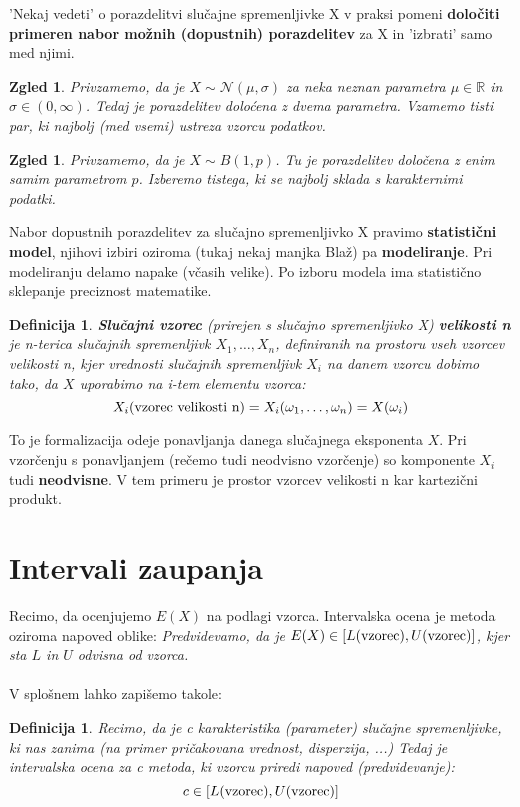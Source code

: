 \documentclass[11pt]{article}
\newtheorem{Definicija}[Izrek]{{\sc Definicija}}
\newtheorem{Zgled}[Izrek]{{\sc Zgled}}
\begin{document}
'Nekaj vedeti' o porazdelitvi slučajne spremenljivke X v praksi pomeni \textbf{določiti primeren nabor možnih (dopustnih) porazdelitev} za X in 'izbrati' samo med njimi.
\begin{Zgled}
	Privzamemo, da je $X\sim \mathcal{N}(\mu, \sigma)$ za neka neznan parametra  $\mu \in \mathbb{R}$ in $\sigma\in(0, \infty)$. Tedaj je porazdelitev doloćena z dvema parametra. Vzamemo tisti par, ki najbolj (med vsemi) ustreza vzorcu podatkov.
\end{Zgled}		
\begin{Zgled}
	Privzamemo, da je $X\sim B(1,p)$. Tu je porazdelitev določena  z enim samim parametrom $p$. Izberemo tistega, ki se najbolj sklada s karakternimi podatki.
\end{Zgled}

Nabor dopustnih porazdelitev za slučajno spremenljivko X pravimo \textbf{statistični model}, njihovi izbiri oziroma (tukaj nekaj manjka Blaž) pa \textbf{modeliranje}. Pri modeliranju delamo napake (včasih velike). Po izboru modela ima statistično sklepanje preciznost matematike.
\begin{Definicija}
	\textbf{Slučajni vzorec} (prirejen s slučajno spremenljivko X) \textbf{velikosti n} je n-terica slučajnih spremenljivk $X_1, \ldots, X_n$, definiranih na prostoru vseh vzorcev velikosti n, kjer vrednosti slučajnih spremenljivk $X_i$ na danem vzorcu dobimo tako, da $X$ uporabimo na i-tem elementu vzorca:
	$$X_i(\textnormal{vzorec velikosti n}) = X_i(\omega_1, \ldots,\omega_n) = X(\omega_i)$$
\end{Definicija}
To je formalizacija odeje ponavljanja danega slučajnega eksponenta $X$. Pri vzorčenju s ponavljanjem (rečemo tudi neodvisno vzorčenje) so komponente $X_i$ tudi \textbf{neodvisne}. V tem primeru je prostor vzorcev velikosti n kar kartezični produkt.


\section{Intervali zaupanja}
Recimo, da ocenjujemo $E(X)$ na podlagi vzorca. Intervalska ocena je metoda oziroma napoved oblike:
\textit{Predvidevamo, da je $E(X) \in [L(\textnormal{vzorec}), U(\textnormal{vzorec})]$, kjer sta $L$ in $U$ odvisna od vzorca. }
\\
\\
V splošnem lahko zapišemo takole:
\\
\begin{Definicija}
	Recimo, da je c karakteristika (parameter) slučajne spremenljivke, ki nas zanima (na primer pričakovana vrednost, disperzija, ...)
	Tedaj je intervalska ocena za c metoda, ki vzorcu priredi napoved
	(predvidevanje):
	$$c\in [L(\textnormal{vzorec}), U(\textnormal{vzorec})]$$
\end{Definicija}
\end{document}
